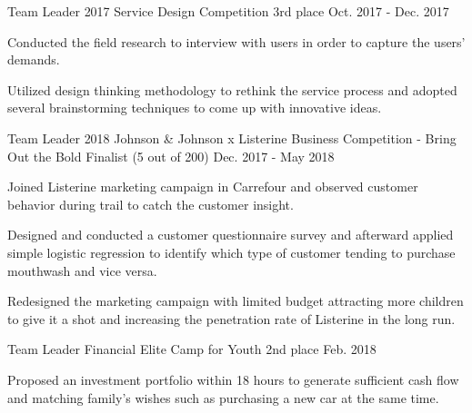 

\begin{cventries}

  \cventry
    {Team Leader} %
    {2017 Service Design Competition} %
    {3rd place} %
    {Oct. 2017 - Dec. 2017} %
    {
      \begin{cvitems} %
        \item {Conducted the field research to interview with users in order to capture the users' demands.}
        \item {Utilized design thinking methodology to rethink the service process and adopted several brainstorming techniques to come up with innovative ideas.}
      \end{cvitems}
    }

  \cventry
    {Team Leader} %
    {2018 Johnson \& Johnson x Listerine Business Competition - Bring Out the Bold} %
    {Finalist (5 out of 200)} %
    {Dec. 2017 - May 2018} %
    {
      \begin{cvitems} %
      	\item {Joined Listerine marketing campaign in Carrefour and observed customer behavior during trail to catch the customer insight.}
        \item {Designed and conducted a customer questionnaire survey and afterward applied simple logistic regression to identify which type of customer tending to purchase mouthwash and vice versa.}
        \item {Redesigned the marketing campaign with limited budget attracting more children to give it a shot and increasing the penetration rate of Listerine in the long run.}
      \end{cvitems}
    }

  \cventry
    {Team Leader} %
    {Financial Elite Camp for Youth} %
    {2nd place} %
    {Feb. 2018} %
    {
      \begin{cvitems} %
      	\item {Proposed an investment portfolio within 18 hours to generate sufficient cash flow and matching family's wishes such as purchasing a new car at the same time.}
      \end{cvitems}
    }

\end{cventries}
